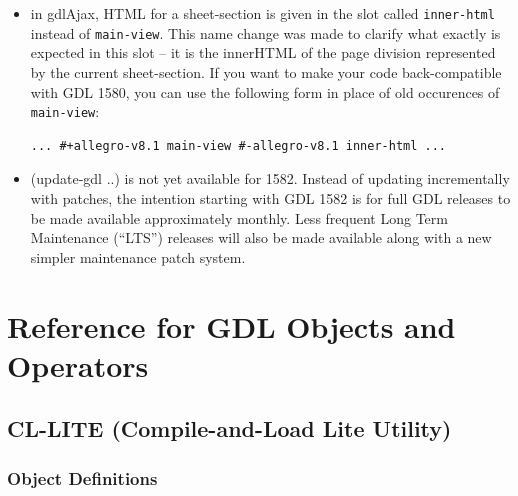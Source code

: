 \documentclass [11pt]{book}
\begin{document}
\begin{itemize}
\item in gdlAjax, HTML for a sheet-section is given in the slot called \texttt{inner-html} instead of \texttt{main-view}. This name change was made to clarify what exactly is
	 expected in this slot -- it is the innerHTML of the page
	 division represented by the current sheet-section. If you
	 want to make your code back-compatible with GDL 1580, you can
	 use the following form in place of old occurences of \texttt{main-view}: 

\begin{verbatim}... #+allegro-v8.1 main-view #-allegro-v8.1 inner-html ...
\end{verbatim}

\item (update-gdl ..) is not yet available for 1582. Instead
of updating incrementally with patches, the intention starting with
GDL 1582 is for full GDL releases to be made available approximately
monthly. Less frequent Long Term Maintenance (``LTS'') releases will
also be made available along with a new simpler maintenance patch
system.

\end{itemize}



\chapter{Reference for GDL Objects and Operators}

\label{chap:referenceforgdlobjectsandoperators}



\section{CL-LITE (Compile-and-Load Lite Utility)}

\label{sec:cl-lite(compile-and-loadliteutility)}





\subsection{Object Definitions}

\label{subsec:objectdefinitions}
\end{document}
